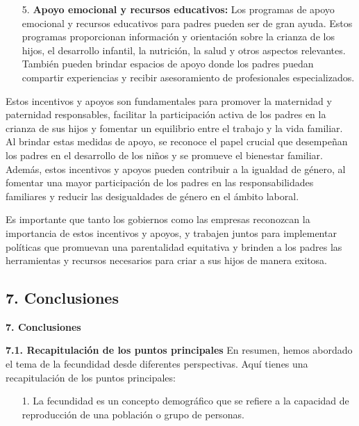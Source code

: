\documentclass[8pt,a4paper]{beamer}
\begin{document}
{\begin{frame}{}
\begin{block}{}
\setlength{\parskip}{3px}
\justifying
\begin{enumerate}
\setlength{\parskip}{3px}
\justifying
\item[5.] \textbf{Apoyo emocional y recursos educativos:} Los programas de apoyo emocional y recursos educativos para padres pueden ser de gran ayuda. Estos programas proporcionan información y orientación sobre la crianza de los hijos, el desarrollo infantil, la nutrición, la salud y otros aspectos relevantes. También pueden brindar espacios de apoyo donde los padres puedan compartir experiencias y recibir asesoramiento de profesionales especializados.
\end{enumerate}
Estos incentivos y apoyos son fundamentales para promover la maternidad y paternidad responsables, facilitar la participación activa de los padres en la crianza de sus hijos y fomentar un equilibrio entre el trabajo y la vida familiar. Al brindar estas medidas de apoyo, se reconoce el papel crucial que desempeñan los padres en el desarrollo de los niños y se promueve el bienestar familiar. Además, estos incentivos y apoyos pueden contribuir a la igualdad de género, al fomentar una mayor participación de los padres en las responsabilidades familiares y reducir las desigualdades de género en el ámbito laboral.

Es importante que tanto los gobiernos como las empresas reconozcan la importancia de estos incentivos y apoyos, y trabajen juntos para implementar políticas que promuevan una parentalidad equitativa y brinden a los padres las herramientas y recursos necesarios para criar a sus hijos de manera exitosa.

\end{block}
\end{frame}


\subsection{7. Conclusiones}
\begin{frame}{\textbf{7. Conclusiones}}
\begin{block}{\textbf{7.1. Recapitulación de los puntos principales}}
\setlength{\parskip}{3px}
\justifying
En resumen, hemos abordado el tema de la fecundidad desde diferentes perspectivas. Aquí tienes una recapitulación de los puntos principales:
\begin{enumerate}
\setlength{\parskip}{3px}
\justifying
\item[1.] La fecundidad es un concepto demográfico que se refiere a la capacidad de reproducción de una población o grupo de personas.


\end{enumerate}
\end{block}
\end{frame}}
\end{document}
